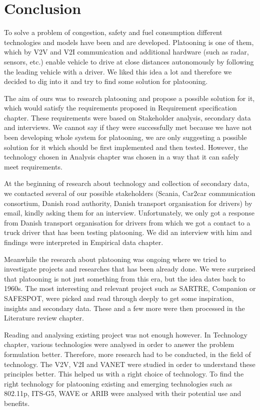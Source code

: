 \section{Conclusion}\label{sec:conclusion}
\par
%
To solve a problem of congestion, safety and fuel consumption different technologies and models have been and are developed. Platooning is one of them, which by V2V and V2I communication and additional hardware (such as radar, sensors, etc.) enable vehicle to drive at close distances autonomously by following the leading vehicle with a driver. We liked this idea a lot and therefore we decided to dig into it and try to find some solution for platooning.\par
%
The aim of ours was to research platooning and propose a possible solution for it, which would satisfy the requirements proposed in Requirement specification chapter. These requirements were based on Stakeholder analysis, secondary data and interviews. We cannot say if they were successfully met because we have not been developing whole system for platooning, we are only suggesting a possible solution for it which should be first implemented and then tested. However, the technology chosen in Analysis chapter was chosen in a way that it can safely meet requirements.\par
%
At the beginning of research about technology and collection of secondary data, we contacted several of our possible stakeholders (Scania, Car2car communication consortium, Danish road authority, Danish transport organisation for drivers) by email, kindly asking them for an interview. Unfortunately, we only got a response from Danish transport organisation for drivers from which we got a contact to a truck driver that has been testing platooning. We did an interview with him and findings were interpreted in Empirical data chapter.\par
%
Meanwhile the research about platooning was ongoing where we tried to investigate projects and researches that has been already done. We were surprised that platooning is not just something from this era, but the idea dates back to 1960s. The most interesting and relevant project such as SARTRE, Companion or SAFESPOT, were picked and read through deeply to get some inspiration, insights and secondary data. These and a few more were then processed in the Literature review chapter.\par
%
Reading and analysing existing project was not enough however. In Technology chapter, various technologies were analysed in order to answer the problem formulation better. Therefore, more research had to be conducted, in the field of technology. The V2V, V2I and VANET were studied in order to understand these principles better. This helped us with a right choice of technology. To find the right technology for platooning existing and emerging technologies such as 802.11p, ITS-G5, WAVE or ARIB were analysed with their potential use and benefits. \par
